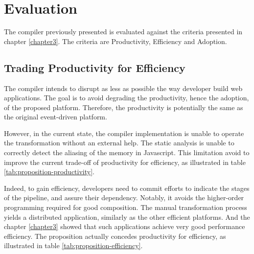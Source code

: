 \section{Evaluation} \label{chapter4:evaluation}

The compiler previously presented is evaluated against the criteria presented in chapter \ref{chapter3}.
The criteria are Productivity, Efficiency and Adoption.

\subsection{Trading Productivity for Efficiency}


The compiler intends to disrupt as less as possible the way developer build web applications.
The goal is to avoid degrading the productivity, hence the adoption, of the proposed platform.
Therefore, the productivity is potentially the same as the original event-driven platform.

However, in the current state, the compiler implementation is unable to operate the transformation without an external help.
The static analysis is unable to correctly detect the aliasing of the memory in Javascript.
This limitation avoid to improve the current trade-off of productivity for efficiency, as illustrated in table \ref{tab:proposition-productivity}.



Indeed, to gain efficiency, developers need to commit efforts to indicate the stages of the pipeline, and assure their dependency.
Notably, it avoids the higher-order programming required for good composition.
The manual transformation process yields a distributed application, similarly as the other efficient platforms.
And the chapter \ref{chapter3} showed that such applications achieve very good performance efficiency.
The proposition actually concedes productivity for efficiency, as illustrated in table \ref{tab:proposition-efficiency}.

